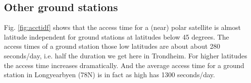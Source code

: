 \subsection{Other ground stations}
Fig. \ref{fig:acctidf} shows that the access time for a (near) polar satellite is almost latitude independent for ground stations at latitudes below 45 degrees. The access times of a ground station those low latitudes are about about 280 seconds/day, i.e. half the duration we get here in Trondheim. For higher latitudes the access time increases dramatically. And the average access time for a ground station in Longyearbyen (78N) is in fact as high has 1300 seconds/day.
